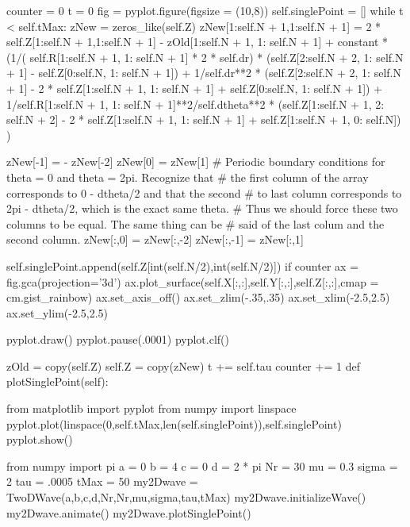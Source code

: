 \begin{enumerate}
\begin{codeexample}
\begin{VerbatimOut}{\listingFile}
        counter = 0
        t = 0
        fig = pyplot.figure(figsize = (10,8))
        self.singlePoint = []
        while t < self.tMax:
            zNew = zeros_like(self.Z)
            zNew[1:self.N + 1,1:self.N + 1] = 2 * self.Z[1:self.N + 1,1:self.N + 1] - zOld[1:self.N + 1, 1: self.N + 1] + constant * (1/( self.R[1:self.N + 1, 1: self.N + 1] * 2 * self.dr) * (self.Z[2:self.N + 2, 1: self.N + 1] - self.Z[0:self.N, 1: self.N + 1]) + 1/self.dr**2 * (self.Z[2:self.N + 2, 1: self.N + 1] - 2 * self.Z[1:self.N + 1, 1: self.N + 1] + self.Z[0:self.N, 1: self.N + 1]) + 1/self.R[1:self.N + 1, 1: self.N + 1]**2/self.dtheta**2 * (self.Z[1:self.N + 1, 2: self.N + 2] - 2 * self.Z[1:self.N + 1, 1: self.N + 1] + self.Z[1:self.N + 1, 0: self.N])    )
            
            zNew[-1] = - zNew[-2]
            zNew[0] = zNew[1]
            # Periodic boundary conditions for theta = 0 and theta = 2pi.  Recognize that
            # the first column of the array corresponds to 0 - dtheta/2 and that the second
            # to last column corresponds to 2pi - dtheta/2, which is the exact same theta.  
            # Thus we should force these two columns to be equal.  The same thing can be
            # said of the last colum and the second column.            zNew[:,0] = zNew[:,-2]
            zNew[:,-1] = zNew[:,1]
            
            
            self.singlePoint.append(self.Z[int(self.N/2),int(self.N/2)])
            if counter %
                ax = fig.gca(projection='3d')
                ax.plot_surface(self.X[:,:],self.Y[:,:],self.Z[:,:],cmap = cm.gist_rainbow)
                ax.set_axis_off()
                ax.set_zlim(-.35,.35)
                ax.set_xlim(-2.5,2.5)
                ax.set_ylim(-2.5,2.5)

                pyplot.draw()
                pyplot.pause(.0001)
                pyplot.clf()

            zOld = copy(self.Z)
            self.Z = copy(zNew)
            t += self.tau
            counter += 1
    def plotSinglePoint(self):

        from matplotlib import pyplot
        from numpy import linspace
        pyplot.plot(linspace(0,self.tMax,len(self.singlePoint)),self.singlePoint)
        pyplot.show()

from numpy import pi
a = 0
b = 4
c = 0
d = 2 * pi
Nr = 30
mu = 0.3
sigma = 2
tau = .0005
tMax = 50
my2Dwave = TwoDWave(a,b,c,d,Nr,Nr,mu,sigma,tau,tMax)
my2Dwave.initializeWave()
my2Dwave.animate()
my2Dwave.plotSinglePoint()


\end{VerbatimOut}
\end{codeexample}
\end{enumerate}
